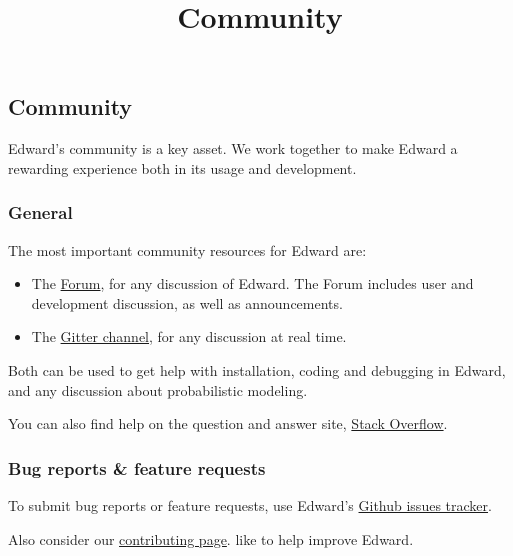\title{Community}

\subsection{Community}

Edward's community is a key asset. We work together to make Edward a
rewarding experience both in its usage and development.

\subsubsection{General}

The most important community resources for Edward are:

\begin{itemize}
\item
The
\href{#}{Forum},
for any discussion of Edward. The Forum includes user and development
discussion, as well as announcements.
\item
The
\href{http://gitter.im/blei-lab/edward}{Gitter channel},
for any discussion at real time.
\end{itemize}

Both can be used to get help with installation, coding and debugging
in Edward, and any discussion about probabilistic modeling.

You can also find help on the question and answer site,
\href{http://stackoverflow.com}{Stack Overflow}.

\subsubsection{Bug reports \& feature requests}

To submit bug reports or feature requests, use Edward's
\href{https://github.com/blei-lab/edward/issues}{Github issues tracker}.

Also consider our
\href{/contributing}{contributing page}.
like to help improve Edward.

